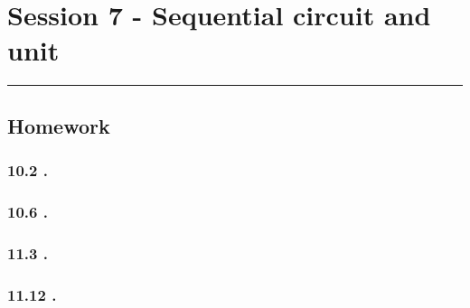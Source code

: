 \section{Session 7 - Sequential circuit and unit}
\vspace{-15pt}\noindent\rule{\textwidth}{0.1pt}\vspace{-10pt}
    \subsection{Homework}
    \subsubsection{10.2 \textnormal{}.}
    {\color{hwSolution}

    }

    \subsubsection{10.6 \textnormal{}.}
    {\color{hwSolution}

    }

    \subsubsection{11.3 \textnormal{}.}
    {\color{hwSolution}

    }

    \subsubsection{11.12 \textnormal{}.}
    {\color{hwSolution}

    }